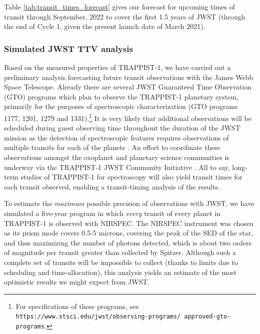 \documentclass[twocolumn]{aastex63}
\begin{document}
Table \ref{tab:transit_times_forecast} gives our forecast for upcoming times of transit through September, 2022 to cover the first 1.5 years of JWST (through the end of Cycle 1, given the present launch date of March 2021).


\subsubsection{Simulated JWST TTV analysis}

Based on the measured properties of TRAPPIST-1, we have carried out a preliminary analysis forecasting future transit observations with the James Webb Space Telescope. Already there are several JWST Guaranteed Time Observation (GTO) programs which plan to observe the TRAPPIST-1 planetary system, primarily for the purposes of spectroscopic characterization (GTO programs 1177, 1201, 1279 and 1331).\footnote{For specifications of these programs, see \texttt{https://www.stsci.edu/jwst/observing-programs/ approved-gto-programs}.}  It is very likely that additional observations will be scheduled during guest observing  time throughout the duration of the JWST mission as the detection of spectroscopic features requires observations of multiple transits for each of the planets \citep{Morley2017,Barstow2016,Lustig-Yaeger2019,Fauchez2020b}.   An effort to coordinate these observations amongst the exoplanet and planetary science communities is underway via the TRAPPIST-1 JWST Community Initiative \citep{Gillon2020}.  All to say, long-term studies of TRAPPIST-1 for spectroscopy will also yield transit times for each transit observed, enabling a transit-timing analysis of the results.

To estimate the {\it maximum} possible precision of observations with JWST, we have simulated a five-year program in which {\it every} transit of every planet in TRAPPIST-1 is observed with NIRSPEC.   The NIRSPEC instrument was chosen as its prism mode covers 0.5-5 microns, covering the peak of the SED of the star, and thus maximizing the number of photons detected, which is about two orders of magnitude per transit greater than collected by Spitzer. Although such a complete set of transits will be impossible to collect (thanks to limits due to scheduling and time-allocation), this analysis yields an estimate of the most optimistic results we might expect from JWST.
\end{document}
